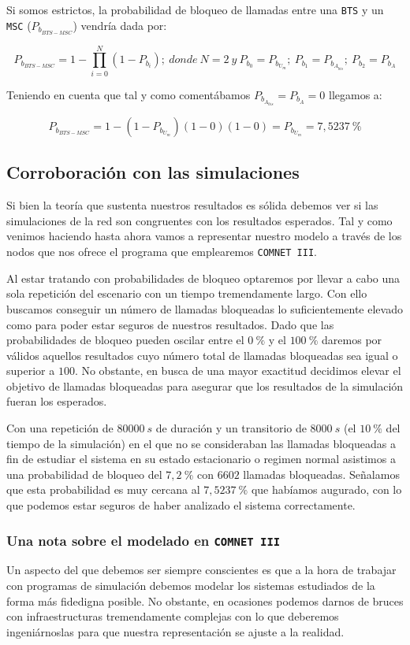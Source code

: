 \documentclass[10pt]{article}
\begin{document}
			Si somos estrictos, la probabilidad de bloqueo de llamadas entre una \texttt{BTS} y un \texttt{MSC} ($P_{b_{BTS-MSC}}$) vendría dada por:

			\begin{equation}
				P_{b_{BTS-MSC}} = 1 - \prod_{i = 0}^N (1 - P_{b_i});\ donde\ N = 2\ y\ P_{b_0} = P_{b_{U_m}};\ P_{b_1} = P_{b_{A_{bis}}};\ P_{b_2} = P_{b_A}
				\label{eq:Pb}
			\end{equation}

			Teniendo en cuenta que tal y como comentábamos $P_{b_{A_{bis}}} = P_{b_A} = 0$ llegamos a:

			$$P_{b_{BTS-MSC}} = 1 - (1 - P_{b_{U_m}})(1 - 0)(1 - 0) = P_{b_{U_m}} = 7,5237\ \%$$

		\subsection{Corroboración con las simulaciones}
			Si bien la teoría que sustenta nuestros resultados es sólida debemos ver si las simulaciones de la red son congruentes con los resultados esperados. Tal y como venimos haciendo hasta ahora vamos a representar nuestro modelo a través de los nodos que nos ofrece el programa que emplearemos \texttt{COMNET III}.

			Al estar tratando con probabilidades de bloqueo optaremos por llevar a cabo una sola repetición del escenario con un tiempo tremendamente largo. Con ello buscamos conseguir un número de llamadas bloqueadas lo suficientemente elevado como para poder estar seguros de nuestros resultados. Dado que las probabilidades de bloqueo pueden oscilar entre el $0\ \%$ y el $100\ \%$ daremos por válidos aquellos resultados cuyo número total de llamadas bloqueadas sea igual o superior a $100$. No obstante, en busca de una mayor exactitud decidimos elevar el objetivo de llamadas bloqueadas para asegurar que los resultados de la simulación fueran los esperados.

			Con una repetición de $80000\ s$ de duración y un transitorio de $8000\ s$ (el $10\ \%$ del tiempo de la simulación) en el que no se consideraban las llamadas bloqueadas a fin de estudiar el sistema en su estado estacionario o regimen normal asistimos a una probabilidad de bloqueo del $7,2\ \%$ con $6602$ llamadas bloqueadas. Señalamos que esta probabilidad es muy cercana al $7,5237\ \%$ que habíamos augurado, con lo que podemos estar seguros de haber analizado el sistema correctamente.

			\subsubsection{Una nota sobre el modelado en \texttt{COMNET III}}
				Un aspecto del que debemos ser siempre conscientes es que a la hora de trabajar con programas de simulación debemos modelar los sistemas estudiados de la forma más fidedigna posible. No obstante, en ocasiones podemos darnos de bruces con infraestructuras tremendamente complejas con lo que deberemos ingeniárnoslas para que nuestra representación se ajuste a la realidad.
\end{document}
